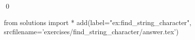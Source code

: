 
\begin{ex} 
  \label{ex:find_string_character}
  
  \qed
\end{ex} 
\begin{python0}
from solutions import *
add(label="ex:find_string_character",
    srcfilename='exercises/find_string_character/answer.tex') 
\end{python0}
